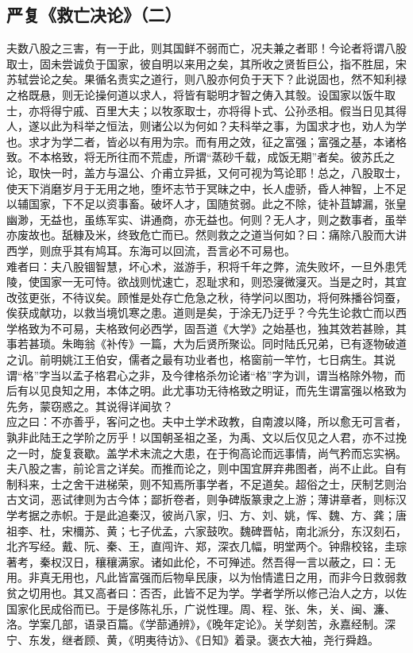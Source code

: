 \documentclass[letterpaper, 12pt]{article}
\begin{document}
\begin{multicols}{2}
\section{严复《救亡决论》（二）}
夫数八股之三害，有一于此，则其国鲜不弱而亡，况夫兼之者耶！今论者将谓八股取士，固未尝诚负于国家，彼自明以来用之矣，其所收之贤哲巨公，指不胜屈，宋苏轼尝论之矣。果循名责实之道行，则八股亦何负于天下？此说固也，然不知利禄之格既悬，则无论操何道以求人，将皆有聪明才智之俦入其彀。设国家以饭牛取士，亦将得宁戚、百里大夫；以牧豕取士，亦将得卜式、公孙丞相。假当日见其得人，遂以此为科举之恒法，则诸公以为何如？夫科举之事，为国求才也，劝人为学也。求才为学二者，皆必以有用为宗。而有用之效，征之富强；富强之基，本诸格致。不本格致，将无所往而不荒虚，所谓“蒸砂千载，成饭无期”者矣。彼苏氏之论，取快一时，盖方与温公、介甫立异抵，又何可视为笃论耶！总之，八股取士，使天下消磨岁月于无用之地，堕坏志节于冥昧之中，长人虚骄，昏人神智，上不足以辅国家，下不足以资事畜。破坏人才，国随贫弱。此之不除，徒补苴罅漏，张皇幽渺，无益也，虽练军实、讲通商，亦无益也。何则？无人才，则之数事者，虽举亦废故也。舐糠及米，终致危亡而已。然则救之之道当何如？曰：痛除八股而大讲西学，则庶乎其有鸠耳。东海可以回流，吾言必不可易也。\\

难者曰：夫八股锢智慧，坏心术，滋游手，积将千年之弊，流失败坏，一旦外患凭陵，使国家一无可恃。欲战则忧速亡，忍耻求和，则恐寖微寖灭。当是之时，其宜改弦更张，不待议矣。顾惟是处存亡危急之秋，待学问以图功，将何殊播谷饲蚕，俟获成献功，以救当境饥寒之患。道则是矣，于涂无乃迂乎？今先生论救亡而以西学格致为不可易，夫格致何必西学，固吾道《大学》之始基也，独其效若甚赊，其事若甚琐。朱晦翁《补传》一篇，大为后贤所聚讼。同时陆氏兄弟，已有逐物破道之讥。前明姚江王伯安，儒者之最有功业者也，格窗前一竿竹，七日病生。其说谓“格”字当以孟子格君心之非，及今律格杀勿论诸“格”字为训，谓当格除外物，而后有以见良知之用，本体之明。此尤事功无待格致之明证，而先生谓富强以格致为先务，蒙窃惑之。其说得详闻欤？\\

应之曰：不亦善乎，客问之也。夫中土学术政教，自南渡以降，所以愈无可言者，孰非此陆王之学阶之厉乎！以国朝圣祖之圣，为禹、文以后仅见之人君，亦不过挽之一时，旋复衰歇。盖学术末流之大患，在于徇高论而远事情，尚气矜而忘实祸。夫八股之害，前论言之详矣。而推而论之，则中国宜屏弃弗图者，尚不止此。自有制科来，士之舍干进梯荣，则不知焉所事学者，不足道矣。超俗之士，厌制艺则治古文词，恶试律则为古今体；鄙折卷者，则争碑版篆隶之上游；薄讲章者，则标汉学考据之赤帜。于是此追秦汉，彼尚八家，归、方、刘、姚，恽、魏、方、龚；唐祖李、杜，宋檷苏、黄；七子优孟，六家鼓吹。魏碑晋帖，南北派分，东汉刻石，北齐写经。戴、阮、秦、王，直闯许、郑，深衣几幅，明堂两个。钟鼎校铭，圭琮著考，秦权汉日，穰穰满家。诸如此伦，不可殚述。然吾得一言以蔽之，曰：无用。非真无用也，凡此皆富强而后物阜民康，以为怡情遣日之用，而非今日救弱救贫之切用也。其又高者曰：否否，此皆不足为学。学者学所以修己治人之方，以佐国家化民成俗而已。于是侈陈礼乐，广说性理。周、程、张、朱，关、闽、濂、洛。学案几部，语录百篇。《学蔀通辨》，《晚年定论》。关学刻苦，永嘉经制。深宁、东发，继者顾、黄，《明夷待访》、《日知》着录。褒衣大袖，尧行舜趋。\\
\end{multicols} 
\end{document}
